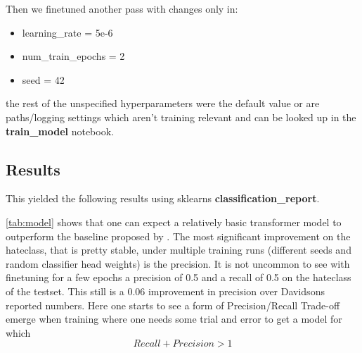 \documentclass[11pt,a4paper]{article}
\begin{document}
Then we finetuned another pass with changes only in:

\begin{itemize}
    \setlength{\itemsep}{0.5pt}
    \item learning\_rate = 5e-6
    \item num\_train\_epochs = 2
    \item seed = 42
\end{itemize}
the rest of the unspecified hyperparameters were the default value or are paths/logging settings which aren't training
relevant and can be looked up in the \textbf{train\_model} notebook.

\subsection{Results}
This yielded the following results using sklearns \textbf{classification\_report}.
\begin{table}
\caption{Classification report for our finetuned model without external features}


\label{tab:model}
\end{table}

\ref{tab:model} shows that one can expect a relatively basic transformer model to outperform the baseline proposed by \cite{auto_hatespeech}.
The most significant improvement on the hateclass, that is pretty stable, under multiple training runs (different seeds and random classifier head weights)
is the precision. It is not uncommon to see with finetuning for a few epochs a precision of 0.5 and a recall of 0.5 on the hateclass of the testset.
This still is a 0.06 improvement in precision over Davidsons reported numbers.
Here one starts to see a form of Precision/Recall Trade-off emerge when training where one needs some trial and error to get a model for which 
$$ Recall + Precision > 1 $$
\end{document}
